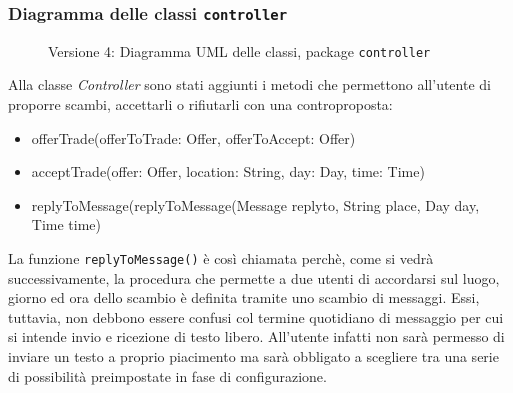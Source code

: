 \subsubsection{Diagramma delle classi \texttt{controller}}
\vspace{0.5cm}
\begin{figure}[H]
    \centering
    \caption{Versione 4: Diagramma UML delle classi, package \texttt{controller}}
    \label{fig:class_controller_v_4}
\end{figure}

Alla classe \textit{Controller} sono stati aggiunti i metodi che permettono all'utente di proporre scambi, accettarli o rifiutarli con una controproposta:
\begin{itemize}
    \item offerTrade(offerToTrade: Offer, offerToAccept: Offer)
    \item acceptTrade(offer: Offer, location: String, day: Day, time: Time)
    \item replyToMessage(replyToMessage(Message replyto, String place, Day day, Time time)
\end{itemize}

La funzione \texttt{replyToMessage()} è così chiamata perchè, come si vedrà successivamente, la procedura che permette a due utenti di accordarsi sul luogo, giorno ed ora dello scambio
è definita tramite uno scambio di messaggi. Essi, tuttavia, non debbono essere confusi col termine quotidiano di messaggio per cui si intende invio e ricezione di testo libero.
All'utente infatti non sarà permesso di inviare un testo a proprio piacimento ma sarà obbligato a scegliere tra una serie di possibilità preimpostate in fase di configurazione.